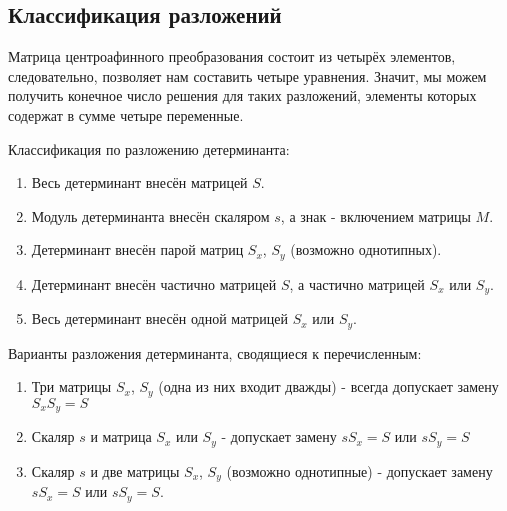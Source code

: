 \subsection{Классификация разложений}

Матрица центроафинного преобразования состоит из четырёх элементов, следовательно, позволяет нам составить четыре уравнения. Значит, мы можем получить конечное число решения для таких разложений, элементы которых содержат в сумме четыре переменные.

Классификация по разложению детерминанта:

\begin{enumerate}
\item Весь детерминант внесён матрицей $S$.
\item Модуль детерминанта внесён скаляром $s$, а знак - включением матрицы $M$.
\item Детерминант внесён парой матриц $S_x$, $S_y$ (возможно однотипных).
\item Детерминант внесён частично матрицей $S$, а частично матрицей $S_x$ или $S_y$.
\item Весь детерминант внесён одной матрицей $S_x$ или $S_y$.
\end{enumerate}

Варианты разложения детерминанта, сводящиеся к перечисленным:
\begin{enumerate}
\item Три матрицы $S_x$, $S_y$ (одна из них входит дважды) - всегда допускает замену $S_x S_y = S$
\item Скаляр $s$ и матрица $S_x$ или $S_y$ - допускает замену $s S_x = S$ или $s S_y = S$
\item Скаляр $s$ и две матрицы $S_x$, $S_y$ (возможно однотипные) - допускает замену $s S_x = S$ или $s S_y = S$.
\end{enumerate}


